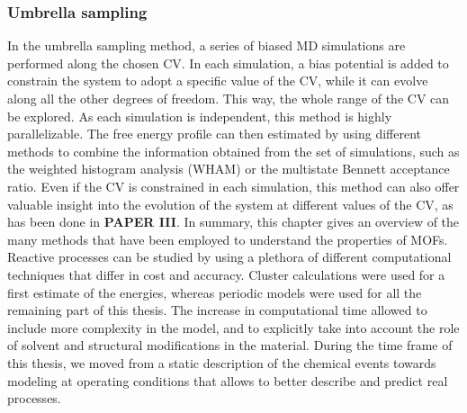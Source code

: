 \subsubsection*{Umbrella sampling}
In the umbrella sampling method, a series of biased MD simulations are performed along the chosen CV. In each simulation, a bias potential is added to constrain the system to adopt a specific value of the CV, while it can evolve along all the other degrees of freedom. This way, the whole range of the CV can be explored. As each simulation is independent, this method is highly parallelizable. The free energy profile can then estimated by using different methods to combine the information obtained from the set of simulations, such as the weighted histogram analysis (WHAM) or the multistate Bennett acceptance ratio\cite{kumar1992weighted, torrie1977nonphysical}. Even if the CV is constrained in each simulation, this method can also offer valuable insight into the evolution of the system at different values of the CV, as has been done in \textbf{PAPER III}.
\npar
\npar
\npar
\npar
\npar
In summary, this chapter gives an overview of the many methods that have been employed to understand the properties of MOFs. Reactive processes can be studied by using a plethora of different computational techniques that differ in cost and accuracy. Cluster calculations were used for a first estimate of the energies, whereas periodic models were used for all the remaining part of this thesis. The increase in computational time allowed to include more complexity in the model, and to explicitly take into account the role of solvent and structural modifications in the material. During the time frame of this thesis, we moved from a static description of the chemical events towards modeling at operating conditions that allows to better describe and predict real processes. 
\clearpage{\pagestyle{empty}\cleardoublepage}